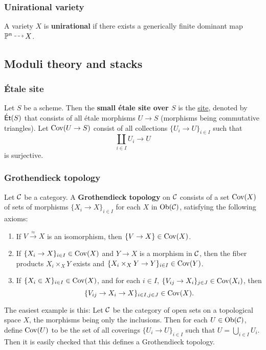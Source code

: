 \documentclass[11pt, english]{article}
\begin{document}
\subsubsection{Unirational variety}
\label{unirational}

A variety $X$ is \textbf{unirational} if there exists a generically finite dominant map $\PP^n \rmap X$. 

\subsection{Moduli theory and stacks} 

\subsubsection{Étale site}
\label{etalesite}

Let $S$ be a scheme. Then the \textbf{small étale site over $S$} is the \hyperref[site]{site}, denoted by $\mathsf{\acute{E}t}(S)$ that consists of all étale morphisms $U \to S$ (morphisms being commutative triangles). Let $\operatorname{Cov}(U \to S)$ consist of all collections $\{ U_i \to U \}_{i \in I}$ such that
\[
\coprod_{i \in I} U_i \to U
\]
is surjective.

\subsubsection{Grothendieck topology}
\label{grothendiecktopology}

Let $\mathcal{C}$ be a category. A \textbf{Grothendieck topology} on $\mathcal{C}$ consists of a set $\operatorname{Cov}(X)$ of sets of morphisms $\{ X_i \to X\}_{i \in I}$ for each $X$ in $\mathrm{Ob}(\mathcal{C})$, satisfying the following axioms:
\begin{enumerate}
\item If $V \xrightarrow{\approx} X$ is an isomorphism, then $\{ V \to X\} \in \operatorname{Cov}(X)$.
\item If $\{X_i \to X\}_{i \in I} \in \operatorname{Cov}(X)$ and $Y \to X$ is a morphism in $\mathcal{C}$, then the fiber products $X_i \times_X Y$ exists and ${\{ X_i \times_X Y \to Y\}_{i \in I} \in \operatorname{Cov}(Y)}$.
\item If $\{X_i \in X\}_{i \in I} \in \operatorname{Cov}(X)$, and for each $i \in I$, $\{ V_{ij} \to X_i\}_{j \in J} \in  \operatorname{Cov}(X_i)$, then
\[
\{ V_{ij} \to X_i \to X\}_{i \in I, j \in J} \in \operatorname{Cov}(X).
\]
\end{enumerate}

The easiest example is this: Let $\mathcal{C}$ be the category of open sets on a topological space $X$, the morphisms being only the inclusions. Then for each $U \in \mathrm{Ob}(\mathcal{C})$, define $\operatorname{Cov}(U)$ to be the set of all coverings $\{ U_i \to U \}_{i \in I}$ such that $U = \bigcup_{i\in I} U_i$. Then it is easily checked that this defines a Grothendieck topology.
\end{document}
